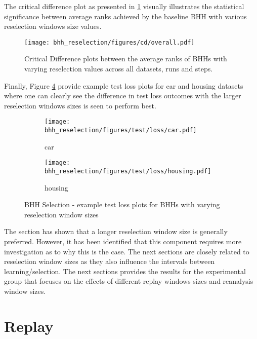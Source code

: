 The critical difference plot as presented in \ref{fig:results:reselection:descriptive:cd} visually illustrates the statistical significance between average ranks achieved by the baseline \Ac{BHH} with various reselection windows size values.

\begin{figure}[htbp]
      \centering
      \texttt{[image: bhh\_reselection/figures/cd/overall.pdf]}
      \caption{Critical Difference plots between the average ranks of \Acsp{BHH} with varying reselection values across all datasets, runs and steps.}
      \label{fig:results:reselection:descriptive:cd}
\end{figure}

Finally, Figure \ref{fig:results:reselection:figures:loss} provide example test loss plots for car and housing datasets where one can clearly see the difference in test loss outcomes with the larger reselection windows sizes is seen to perform best.

\begin{figure}[htbp]
      \begin{subfigure}{0.5\textwidth}
            \centering
            \texttt{[image: bhh\_reselection/figures/test/loss/car.pdf]}
            \caption{car}
            \label{fig:results:reselection:figures:loss1}
      \end{subfigure}
      \begin{subfigure}{0.5\textwidth}
            \centering
            \texttt{[image: bhh\_reselection/figures/test/loss/housing.pdf]}
            \caption{housing}
            \label{fig:results:reselection:figures:loss2}
      \end{subfigure}
      \caption{\Acs{BHH} Selection - example test loss plots for \Acsp{BHH} with varying reselection window sizes}
      \label{fig:results:reselection:figures:loss}
\end{figure}

The section has shown that a longer reselection window size is generally preferred. However, it has been identified that this component requires more investigation as to why this is the case. The next sections are closely related to reselection window sizes as they also influence the intervals between learning/selection. The next sections provides the results for the experimental group that focuses on the effects of different replay windows sizes and reanalysis window sizes.


\section{Replay}
\label{sec:results:replay}

